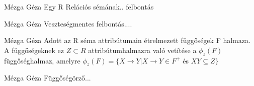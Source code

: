 \begin{definicio}{Mézga Géza}
Egy R Relációs sémának.. felbontás
\end{definicio}

\begin{definicio}{Mézga Géza}
Veszteségmentes felbontás....
\end{definicio}

\begin{definicio}{Mézga Géza}
Adott az R séma attribútumain étrelmezett függőségek F halmaza. A függőségeknek ez $Z \subset R$ attribútumhalmazra való vetítése a $\phi_z(F)$ függőséghalmaz, amelyre $\phi_z(F) = \lbrace X\rightarrow Y | X\rightarrow Y \in F^+$ és $XY \subseteq Z \rbrace$
\end{definicio}

\begin{definicio}{Mézga Géza}
Függőségörző...
\end{definicio}
